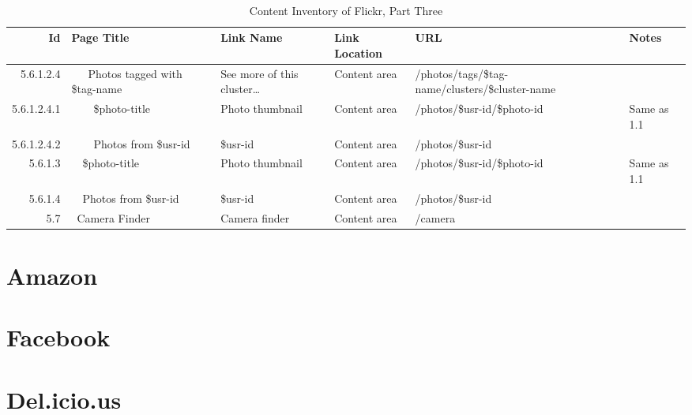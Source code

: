 \documentclass[12pt,a4paper]{article}
\begin{document}
\begin{landscape}
  \begin{table}[h!b!p!]
    \caption{Content Inventory of Flickr, Part Three}
    \label{table:content.inventory.flickr.3}
    \begin{center}
      \begin{tiny}
        \tt
        \begin{tabular}{r|l|l|l|l|p{3cm}}
            Id &
            Page Title &
            Link Name &
            Link Location &
            URL &
            Notes \\

            \hline

                    5.6.1.2.4 &
                    ~~~Photos tagged with \$tag-name &
                    See more of this cluster\ldots &
                    Content area &
                    /photos/tags/\$tag-name/clusters/\$cluster-name &
                    \\

                      5.6.1.2.4.1 &
                      ~~~~\$photo-title &
                      Photo thumbnail &
                      Content area &
                      /photos/\$usr-id/\$photo-id &
                      Same as 1.1 \\

                      5.6.1.2.4.2 &
                      ~~~~Photos from \$usr-id &
                      \$usr-id &
                      Content area &
                      /photos/\$usr-id &
                      \\

                  5.6.1.3 &
                  ~~\$photo-title &
                  Photo thumbnail &
                  Content area &
                  /photos/\$usr-id/\$photo-id &
                  Same as 1.1 \\

                  5.6.1.4 &
                  ~~Photos from \$usr-id &
                  \$usr-id &
                  Content area &
                  /photos/\$usr-id &
                  \\

              5.7 &
              ~Camera Finder &
              Camera finder &
              Content area &
              /camera &
              \\

          \end{tabular}
        \rm
      \end{tiny}
    \end{center}
  \end{table}
\end{landscape}

\section{Amazon}

\section{Facebook}

\section{Del.icio.us}
\end{document}
